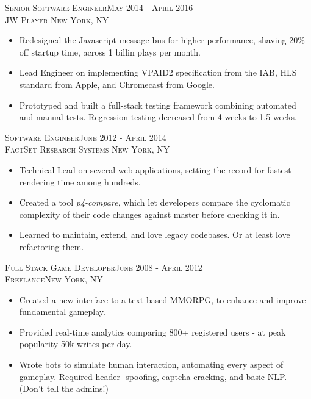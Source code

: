 \documentclass[oneside, final]{scrartcl}
\begin{document}
\begin{center}
\textsc{Senior Software Engineer\hfill May 2014 - April 2016\\}
\textsc{JW Player \hfill New York, NY\\}
\begin{itemize}
	\setlength{\itemsep}{1pt}
	\setlength{\itemsep}{1pt}
	\setlength{\parskip}{0pt}
	\setlength{\parsep}{0pt}
	\setlength{\leftmargin}{-5mm}
        \item Redesigned the Javascript message bus for higher performance, shaving 20\% off startup time, across 1 billin plays per month.
        \item Lead Engineer on implementing VPAID2 specification from the IAB, HLS standard from Apple, and Chromecast from Google.
        \item Prototyped and built a full-stack testing framework combining automated and manual tests. Regression testing decreased from 4 weeks to 1.5 weeks.
\end{itemize}

\textsc{Software Engineer\hfill June 2012 - April 2014\\}
\textsc{FactSet Research Systems \hfill New York, NY\\}
\begin{itemize}
	\setlength{\itemsep}{1pt}
	\setlength{\parskip}{0pt}
	\setlength{\parsep}{0pt}
	\setlength{\leftmargin}{-5mm}
	\item Technical Lead on several web applications, setting the record for fastest rendering time among hundreds.
	\item Created a tool \textit{p4-compare}, which let developers compare the cyclomatic complexity of their code
	changes against master before checking it in.
	\item Learned to maintain, extend, and love legacy codebases. Or at least love refactoring them.
\end{itemize}

\textsc{Full Stack Game Developer\hfill June 2008 - April 2012\\}
\textsc{Freelance\hfill New York, NY\\}
\begin{itemize}
	\setlength{\itemsep}{1pt}
	\setlength{\parskip}{0pt}
	\setlength{\parsep}{0pt}
	\setlength{\leftmargin}{-5mm}
	\item Created a new interface to a text-based MMORPG, to enhance and improve fundamental gameplay.
    \item Provided real-time analytics comparing 800+ registered users - at peak popularity 50k writes per day.
    \item Wrote bots to simulate human interaction, automating every aspect of gameplay. Required header-
            spoofing, captcha cracking, and basic NLP. (Don’t tell the admins!)
\end{itemize}



\end{center}
\end{document}
